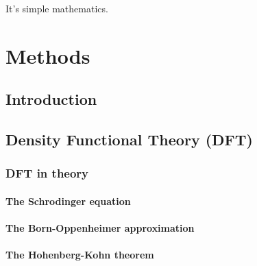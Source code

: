 \begin{savequote}[8cm]
It's simple mathematics.
\end{savequote}

\chapter{\label{ch:3-methods}Methods}

\minitoc



\section{Introduction} 

\section{Density Functional Theory (DFT)}
\subsection{DFT in theory}


\subsubsection{The Schrodinger equation}



\subsubsection{The Born-Oppenheimer approximation}



\subsubsection{The Hohenberg-Kohn theorem}

